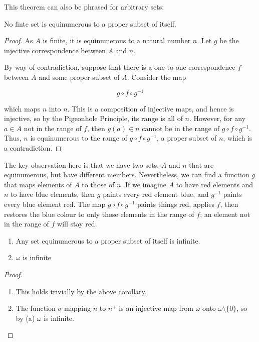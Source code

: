 This theorem can also be phrased for arbitrary sets:

\begin{corollary}
    No finte set is equinumerous to a proper subset of itself. 
\end{corollary}

\begin{proof}
    As $A$ is finite, it is equinumerous to a natural number $n$. Let $g$ be the injective correspondence between $A$ and $n$. 

    By way of contradiction, suppose that there is a one-to-one correspondence $f$ between $A$ and some proper subset of $A$. Consider the map 

    \[g \circ f \circ g^{-1}\]

    which maps $n$ into $n$. This is a composition of injective maps, and hence is injective, so by the Pigeonhole Principle, its range is all of $n$. However, for any $a \in A$ not in the range of $f$, then $g(a) \in n$ cannot be in the range of $g \circ f \circ g^{-1}$. Thus, $n$ is equinumerous to the range of $g \circ f \circ g^{-1}$, a proper subset of $n$, which is a contradiction.  
\end{proof}

The key observation here is that we have two sets, $A$ and $n$ that are equinumerous, but have different members. Nevertheless, we can find a function $g$ that maps elements of $A$ to those of $n$. If we imagine $A$ to have red elements and $n$ to have blue elements, then $g$ paints every red element blue, and $g^{-1}$ paints every blue element red. The map $g \circ f \circ g^{-1}$ paints things red, applies $f$, then restores the blue colour to only those elements in the range of $f$; an element not in the range of $f$ will stay red. 

\begin{corollary}
    \begin{enumerate}[label=(\alph*)]
        \item Any set equinumerous to a proper subset of itself is infinite.
        \item $\omega$ is infinite
    \end{enumerate}
\end{corollary}

\begin{proof}
    \begin{enumerate}[label=(\alph*)]
        \item This holds trivially by the above corollary.
        \item The function $\sigma$ mapping $n$ to $n^+$ is an injective map from $\omega$ onto $\omega \setminus \{0\}$, so by (a) $\omega$ is infinite. 
    \end{enumerate}
\end{proof}

